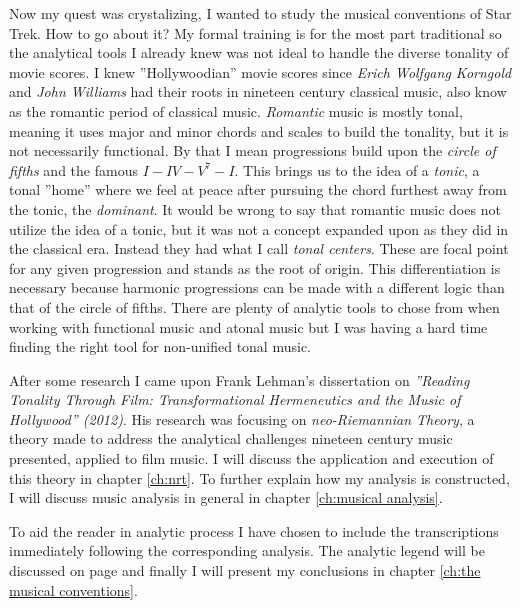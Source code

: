 Now my quest was crystalizing, I wanted to study the musical conventions of Star Trek. How to go about it? My formal training is for the most part traditional so the analytical tools I already knew was not ideal to handle the diverse tonality of movie scores. I knew ''Hollywoodian'' movie scores since \textit{Erich Wolfgang Korngold} and \textit{John Williams} had their roots in nineteen century classical music, also know as the romantic period of classical music. \textit{Romantic} music is mostly tonal, meaning it uses major and minor chords and scales to build the tonality, but it is not necessarily functional. By that I mean progressions build upon the \textit{circle of fifths} and the famous \(I-IV-V^{7}-I\). This brings us to the idea of a \textit{tonic}, a tonal ''home'' where we feel at peace after pursuing the chord furthest away from the tonic, the \textit{dominant}. It would be wrong to say that romantic music does not utilize the idea of a tonic, but it was not a concept expanded upon as they did in the classical era. Instead they had what I call \textit{tonal centers}. These are focal point for any given progression and stands as the root of origin. This differentiation is necessary because harmonic progressions can be made with a different logic than that of the circle of fifths. There are plenty of analytic tools to chose from when working with functional music and atonal music but I was having a hard time finding the right tool for non-unified tonal music.

After some research I came upon Frank Lehman's dissertation on \textit{''Reading Tonality Through Film: Transformational Hermeneutics and the Music of Hollywood'' (2012)}. His research was focusing on \textit{neo-Riemannian Theory}, a theory made to address the analytical challenges nineteen century music presented, applied to film music. I will discuss the application and execution of this theory in chapter \ref{ch:nrt}. To further explain how my analysis is constructed, I will discuss music analysis in general in chapter \ref{ch:musical analysis}. 

To aid the reader in analytic process I have chosen to include the transcriptions immediately following the corresponding analysis. The analytic legend will be discussed on page \pageref{fg:analysis legend} and finally I will present my conclusions in chapter \ref{ch:the musical conventions}.

